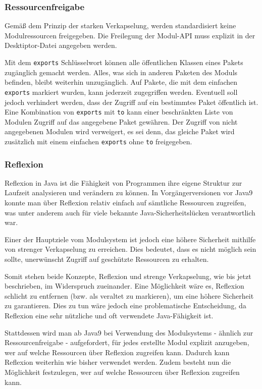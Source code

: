 \subsubsection{Ressourcenfreigabe}
Gemäß dem Prinzip der starken Verkapselung, werden standardisiert keine Modulressourcen freigegeben. 
Die Freilegung der Modul-API muss explizit in der Desktiptor-Datei angegeben werden.

Mit dem \texttt{exports} Schlüsselwort können alle öffentlichen Klassen eines Pakets zugänglich gemacht werden.
Alles, was sich in anderen Paketen des Moduls befinden, bleibt weiterhin unzugänglich.
Auf Pakete, die mit dem einfachen \texttt{exports} markiert wurden, kann jederzeit zugegriffen werden.
Eventuell soll jedoch verhindert werden, dass der Zugriff auf ein bestimmtes Paket öffentlich ist. 
Eine Kombination von \texttt{exports} mit \texttt{to} kann einer beschränkten Liste von Modulen Zugriff auf das angegebene Paket gewähren.
Der Zugriff von nicht angegebenen Modulen wird verweigert, es sei denn, das gleiche Paket wird zusätzlich mit einem einfachen \texttt{exports} ohne \texttt{to} freigegeben.

\subsubsection{Reflexion}
Reflexion in Java ist die Fähigkeit von Programmen ihre eigene Struktur zur Laufzeit analysieren und verändern zu können.
In Vorgängerversionen vor Java9 konnte man über Reflexion relativ einfach auf sämtliche Ressourcen zugreifen, was unter anderem auch für viele bekannte Java-Sicherheitslücken verantwortlich war.

Einer der Hauptziele vom Modulsystem ist jedoch eine höhere Sicherheit mithilfe von strenger Verkapselung zu erreichen. 
Dies bedeutet, dass es nicht möglich sein sollte, unerwünscht Zugriff auf geschützte Ressourcen zu erhalten.

Somit stehen beide Konzepte, Reflexion und strenge Verkapselung, wie bis jetzt beschrieben, im Widerspruch zueinander. 
Eine Möglichkeit wäre es, Reflexion schlicht zu entfernen (bzw. als veraltet zu markieren), um eine höhere Sicherheit zu garantieren. 
Dies zu tun wäre jedoch eine problematische Entscheidung, da Reflexion eine sehr nützliche und oft verwendete Java-Fähigkeit ist. 

Stattdessen wird man ab Java9 bei Verwendung des Modulsystems - ähnlich zur Ressourcenfreigabe - aufgefordert, für jedes erstellte Modul explizit anzugeben, wer auf welche Ressourcen über Reflexion zugreifen kann. 
Dadurch kann Reflexion weiterhin wie bisher verwendet werden.
Zudem besteht nun die Möglichkeit festzulegen,  wer auf welche Ressourcen über Reflexion zugreifen kann. 

